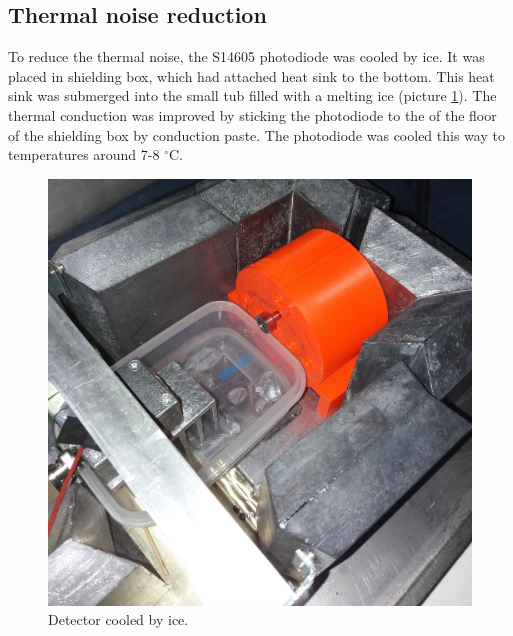 \subsection{Thermal noise reduction}
To reduce the thermal noise, the S14605 photodiode was cooled by ice. It was placed in shielding box, which had attached heat sink to the bottom. This heat sink was submerged into the small tub filled with a melting ice (picture \ref{cooler}). The thermal conduction was improved by sticking the photodiode to the of the floor of the shielding box by conduction paste. The photodiode was cooled this way to temperatures around 7-8 $^\circ$C.


\begin{figure}[H]
 \centering
 \includegraphics[scale=0.09, angle = 0]{./pictures/chlazeniLedem.jpg}
 \caption{Detector cooled by ice.}
 \label{cooler}
 
\end{figure}



